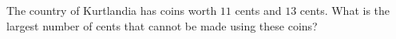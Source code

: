 The country of Kurtlandia has coins worth $11$ cents and $13$ cents. What is the largest number of cents that cannot be made using these coins?
